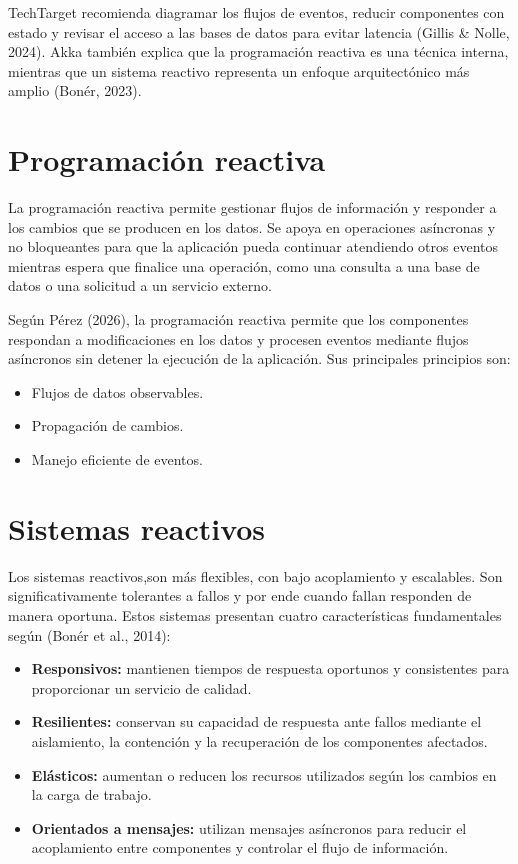 \documentclass[12pt]{article}
\begin{document}
	TechTarget recomienda diagramar los flujos de eventos, reducir componentes con estado y revisar el acceso a las bases de datos para evitar latencia (Gillis \& Nolle, 2024). Akka también explica que la programación reactiva es una técnica interna, mientras que un sistema reactivo representa un enfoque arquitectónico más amplio (Bonér, 2023).
	
	\section*{Programación reactiva}
	
	La programación reactiva permite gestionar flujos de información y responder
	a los cambios que se producen en los datos. Se apoya en operaciones asíncronas
	y no bloqueantes para que la aplicación pueda continuar atendiendo otros
	eventos mientras espera que finalice una operación, como una consulta a una
	base de datos o una solicitud a un servicio externo.
	
	Según Pérez (2026), la programación reactiva permite que los componentes
	respondan a modificaciones en los datos y procesen eventos mediante flujos
	asíncronos sin detener la ejecución de la aplicación. Sus principales
	principios son:
	
	\begin{itemize}
		\item Flujos de datos observables.
		\item Propagación de cambios.
		\item Manejo eficiente de eventos.
	\end{itemize}
	
	\section*{Sistemas reactivos}
	
	Los sistemas reactivos,son más flexibles, con bajo acoplamiento y escalables.	Son significativamente tolerantes a fallos y por ende cuando fallan responden de manera oportuna. Estos sistemas presentan cuatro características fundamentales según	(Bonér et al., 2014):
	
	\begin{itemize}
		
		\item \textbf{Responsivos:} mantienen tiempos de respuesta oportunos
		y consistentes para proporcionar un servicio de calidad.
		
		\item \textbf{Resilientes:} conservan su capacidad de respuesta ante
		fallos mediante el aislamiento, la contención y la recuperación de los
		componentes afectados.
		
		\item \textbf{Elásticos:} aumentan o reducen los recursos utilizados
		según los cambios en la carga de trabajo.
		
		\item \textbf{Orientados a mensajes:} utilizan mensajes asíncronos
		para reducir el acoplamiento entre componentes y controlar el flujo
		de información.
		
	\end{itemize}
	
\end{document}
